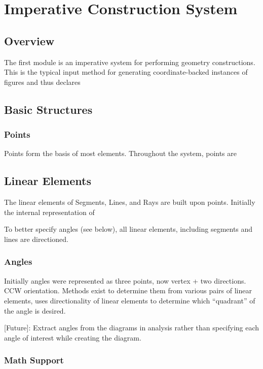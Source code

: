 \chapter{Imperative Construction System}
\label{chap:imperative}

\section{Overview}

The first module is an imperative system for performing geometry
constructions. This is the typical input method for generating
coordinate-backed instances of figures and thus declares

\section{Basic Structures}

\subsection{Points}

Points form the basis of most elements. Throughout the system, points
are

\section{Linear Elements}

The linear elements of Segments, Lines, and Rays are built upon
points. Initially the internal representation of

To better specify angles (see below), all linear elements, including
segments and lines are directioned.

\subsection{Angles}

Initially angles were represented as three points, now vertex + two
directions. CCW orientation. Methods exist to determine them from
various pairs of linear elements, uses directionality of linear
elements to determine which ``quadrant'' of the angle is desired.

[Future]: Extract angles from the diagrams in analysis rather than
specifying each angle of interest while creating the diagram.

\subsection{Math Support}

